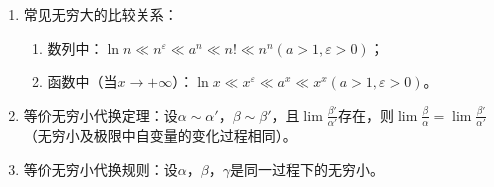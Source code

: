 \documentclass[UTF8]{ctexart}
\theoremstyle{remark}
\begin{document}
\begin{enumerate}
			\item 常见无穷大的比较关系：
			\begin{enumerate}
				\item 数列中：$\ln n \ll n^{\varepsilon} \ll a^{n} \ll n! \ll n^{n}(a>1, \varepsilon>0)$；
				\item 函数中（当$x \to +\infty$）：$\ln x \ll x^{\varepsilon} \ll a^{x} \ll x^{x}(a>1, \varepsilon>0)$。
			\end{enumerate}
			
			\item 等价无穷小代换定理：设$\alpha \sim \alpha'$，$\beta \sim \beta'$，且$\lim \frac{\beta'}{\alpha'}$存在，则$\lim \frac{\beta}{\alpha}=\lim \frac{\beta'}{\alpha'}$（无穷小及极限中自变量的变化过程相同）。
			
			\item 等价无穷小代换规则：设$\alpha$，$\beta$，$\gamma$是同一过程下的无穷小。
			\end{enumerate}
\end{document}
